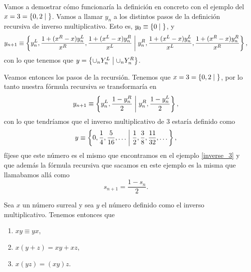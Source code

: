     \begin{example}
        Vamos a demostrar c\'omo funcionar\'ia la definici\'on en concreto con el ejemplo del $x = 3 = \left\{0,2\;\middle|\; \right\}$. Vamos a llamar $y_n$ a los distintos pasos de la definici\'on recursiva de inverso multiplicativo. Esto es, $y_0 \equiv \left\{0\;\middle|\; \right\}$, y 
        \[
            y_{n+1} \equiv \left\{y_n^L, \frac{1+(x^R-x)y_n^L}{x^R}, \frac{1+(x^L-x)y_n^R}{x^L}\;\middle|\; y_n^R, \frac{1+(x^L-x)y_n^L}{x^L}, \frac{1+(x^R-x)y_n^R}{x^R}\right\},
        \]
        con lo que tenemos que $y = \left\{\cup_n Y_n^L\;\middle|\; \cup_n Y_n^R\right\}$. 
        
        Veamos entonces los pasos de la recursi\'on. Tenemos que $x = 3 = \left\{0,2\;\middle|\; \right\}$, por lo tanto nuestra f\'ormula recursiva se transformar\'ia en 
        \[
            y_{n+1} \equiv \left\{y_n^L, \frac{1-y_n^R}{2}\;\middle|\; y_n^R, \frac{1-y_n^L}{2}\right\},
        \]
        con lo que tendr\'iamos que el inverso multiplicativo de $3$ estar\'ia definido como
        \[
            y \equiv \left\{0,\frac{1}{4}, \frac{5}{16}, \dots\;\middle|\; \frac{1}{2}, \frac{3}{8}, \frac{11}{32},\dots\right\},
        \]
        f\'ijese que este n\'umero es el mismo que encontramos en el ejemplo \ref{inverse_3} y que adem\'as la f\'ormula recursiva que sacamos en este ejemplo es la misma que llamabamos all\'a como 
        \[
            s_{n+1} = \frac{1-s_{n}}{2}.
        \]
    \end{example}

    \begin{theorem}
        Sea $x$ un n\'umero surreal y sea $y$ el n\'umero definido como el inverso multiplicativo. Tenemos entonces que
        \begin{enumerate}[nosep]
            \item $xy\equiv yx$,
            \item $x(y+z) = xy + xz$,
            \item $x(yz) = (xy)z$.
        \end{enumerate}
    \end{theorem}